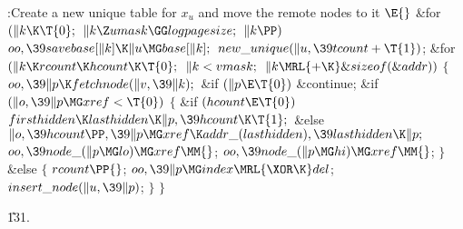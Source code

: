 \Y\B\4:Create a new unique table for $x_u$ and move the remote nodes to it%
\X${}\E{}$\6
\&{for} ${}(\|k\K\T{0};{}$ ${}\|k\Z\\{umask}\GG\\{logpagesize};{}$ ${}\|k%
\PP){}$\1\5
${}\\{oo},\39\\{savebase}[\|k]\K\|u\MG\\{base}[\|k];{}$\2\6
${}\\{new\_unique}(\|u,\39\\{tcount}+\T{1}){}$;\6
\&{for} ${}(\|k\K\\{rcount}\K\\{hcount}\K\T{0};{}$ ${}\|k<\\{vmask};{}$ ${}\|k%
\MRL{+{\K}}\&{sizeof}(\&{addr})){}$\5
${}\{{}$\1\6
${}\\{oo},\39\|p\K\\{fetchnode}(\|v,\39\|k);{}$\6
\&{if} ${}(\|p\E\T{0}){}$\1\5
\&{continue};\2\6
\&{if} ${}(\|o,\39\|p\MG\\{xref}<\T{0}){}$\5
${}\{{}$\1\6
\&{if} ${}(\\{hcount}\E\T{0}){}$\1\5
${}\\{firsthidden}\K\\{lasthidden}\K\|p,\39\\{hcount}\K\T{1};{}$\2\6
\&{else}\1\5
${}\|o,\39\\{hcount}\PP,\39\|p\MG\\{xref}\K\\{addr\_}(\\{lasthidden}),\39%
\\{lasthidden}\K\|p;{}$\2\6
${}\\{oo},\39\\{node\_}(\|p\MG\\{lo})\MG\\{xref}\MM{}$;\6
${}\\{oo},\39\\{node\_}(\|p\MG\\{hi})\MG\\{xref}\MM{}$;\6
\4${}\}{}$\5
\2\&{else}\5
${}\{{}$\1\6
${}\\{rcount}\PP{}$;\6
${}\\{oo},\39\|p\MG\\{index}\MRL{{\XOR}{\K}}\\{del}{}$;\6
${}\\{insert\_node}(\|u,\39\|p){}$;\6
\4${}\}{}$\2\6
\4${}\}{}$\2\par
\U131.\fi

